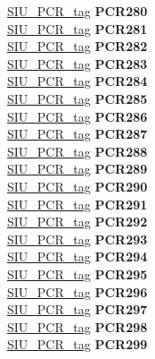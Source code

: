 \begin{DoxyCompactItemize}
\begin{tabbing}
\>\>\mbox{\hyperlink{unionSIU__tag_1_1SIU__PCR__tag}{SIU\_PCR\_tag}} {\bfseries PCR280}\\
\>\>\mbox{\hyperlink{unionSIU__tag_1_1SIU__PCR__tag}{SIU\_PCR\_tag}} {\bfseries PCR281}\\
\>\>\mbox{\hyperlink{unionSIU__tag_1_1SIU__PCR__tag}{SIU\_PCR\_tag}} {\bfseries PCR282}\\
\>\>\mbox{\hyperlink{unionSIU__tag_1_1SIU__PCR__tag}{SIU\_PCR\_tag}} {\bfseries PCR283}\\
\>\>\mbox{\hyperlink{unionSIU__tag_1_1SIU__PCR__tag}{SIU\_PCR\_tag}} {\bfseries PCR284}\\
\>\>\mbox{\hyperlink{unionSIU__tag_1_1SIU__PCR__tag}{SIU\_PCR\_tag}} {\bfseries PCR285}\\
\>\>\mbox{\hyperlink{unionSIU__tag_1_1SIU__PCR__tag}{SIU\_PCR\_tag}} {\bfseries PCR286}\\
\>\>\mbox{\hyperlink{unionSIU__tag_1_1SIU__PCR__tag}{SIU\_PCR\_tag}} {\bfseries PCR287}\\
\>\>\mbox{\hyperlink{unionSIU__tag_1_1SIU__PCR__tag}{SIU\_PCR\_tag}} {\bfseries PCR288}\\
\>\>\mbox{\hyperlink{unionSIU__tag_1_1SIU__PCR__tag}{SIU\_PCR\_tag}} {\bfseries PCR289}\\
\>\>\mbox{\hyperlink{unionSIU__tag_1_1SIU__PCR__tag}{SIU\_PCR\_tag}} {\bfseries PCR290}\\
\>\>\mbox{\hyperlink{unionSIU__tag_1_1SIU__PCR__tag}{SIU\_PCR\_tag}} {\bfseries PCR291}\\
\>\>\mbox{\hyperlink{unionSIU__tag_1_1SIU__PCR__tag}{SIU\_PCR\_tag}} {\bfseries PCR292}\\
\>\>\mbox{\hyperlink{unionSIU__tag_1_1SIU__PCR__tag}{SIU\_PCR\_tag}} {\bfseries PCR293}\\
\>\>\mbox{\hyperlink{unionSIU__tag_1_1SIU__PCR__tag}{SIU\_PCR\_tag}} {\bfseries PCR294}\\
\>\>\mbox{\hyperlink{unionSIU__tag_1_1SIU__PCR__tag}{SIU\_PCR\_tag}} {\bfseries PCR295}\\
\>\>\mbox{\hyperlink{unionSIU__tag_1_1SIU__PCR__tag}{SIU\_PCR\_tag}} {\bfseries PCR296}\\
\>\>\mbox{\hyperlink{unionSIU__tag_1_1SIU__PCR__tag}{SIU\_PCR\_tag}} {\bfseries PCR297}\\
\>\>\mbox{\hyperlink{unionSIU__tag_1_1SIU__PCR__tag}{SIU\_PCR\_tag}} {\bfseries PCR298}\\
\>\>\mbox{\hyperlink{unionSIU__tag_1_1SIU__PCR__tag}{SIU\_PCR\_tag}} {\bfseries PCR299}\\

\end{tabbing}
\end{DoxyCompactItemize}
